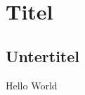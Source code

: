 \documentclass[a4paper, 10pt, fleqn]{article}
\begin{document}
    \section{Titel}
    \subsection{Untertitel}
        Hello World
\end{document}
